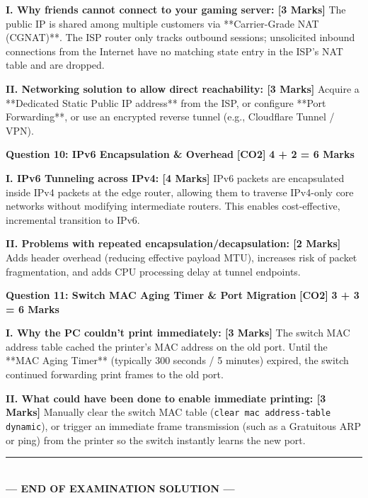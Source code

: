 \documentclass[11pt,a4paper]{article}
\newcommand{\questionheader}[3]{
    \vspace{0.35cm}
    \noindent\colorbox{qboxbg}{
        \parbox{\dimexpr\textwidth-2\fboxsep\relax}{
            \textbf{\textcolor{primary}{\large #1}} \hfill \textbf{\textcolor{accent}{[#2]}} \hfill \textbf{\textcolor{secondary}{#3 Marks}}
        }
    }
    \vspace{0.15cm}
}
\begin{document}
\textbf{I. Why friends cannot connect to your gaming server: [3 Marks]}
The public IP is shared among multiple customers via **Carrier-Grade NAT (CGNAT)**. The ISP router only tracks outbound sessions; unsolicited inbound connections from the Internet have no matching state entry in the ISP's NAT table and are dropped.

\textbf{II. Networking solution to allow direct reachability: [3 Marks]}
Acquire a **Dedicated Static Public IP address** from the ISP, or configure **Port Forwarding**, or use an encrypted reverse tunnel (e.g., Cloudflare Tunnel / VPN).

\questionheader{Question 10: IPv6 Encapsulation \& Overhead}{CO2}{4 + 2 = 6}

\textbf{I. IPv6 Tunneling across IPv4: [4 Marks]}
IPv6 packets are encapsulated inside IPv4 packets at the edge router, allowing them to traverse IPv4-only core networks without modifying intermediate routers. This enables cost-effective, incremental transition to IPv6.

\textbf{II. Problems with repeated encapsulation/decapsulation: [2 Marks]}
Adds header overhead (reducing effective payload MTU), increases risk of packet fragmentation, and adds CPU processing delay at tunnel endpoints.

\questionheader{Question 11: Switch MAC Aging Timer \& Port Migration}{CO2}{3 + 3 = 6}

\textbf{I. Why the PC couldn't print immediately: [3 Marks]}
The switch MAC address table cached the printer's MAC address on the old port. Until the **MAC Aging Timer** (typically 300 seconds / 5 minutes) expired, the switch continued forwarding print frames to the old port.

\textbf{II. What could have been done to enable immediate printing: [3 Marks]}
Manually clear the switch MAC table (\texttt{clear mac address-table dynamic}), or trigger an immediate frame transmission (such as a Gratuitous ARP or ping) from the printer so the switch instantly learns the new port.

\begin{center}
    \rule{\textwidth}{0.8pt}\\[3pt]
    \textbf{\textcolor{primary}{--- END OF EXAMINATION SOLUTION ---}}
\end{center}
\end{document}
